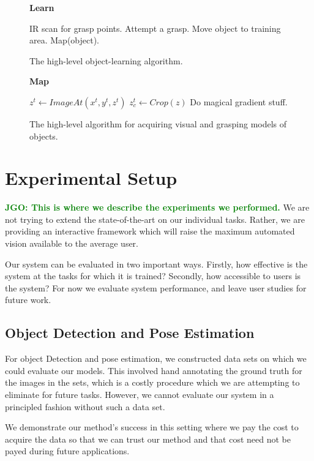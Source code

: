 \documentclass[conference]{IEEEtran}
\newcommand{\jgonote}[1]{\textcolor{green}{\textbf{JGO: #1}}}
\begin{document}
\begin{figure}
  \textbf{Learn}
  \begin{algorithmic}
      \STATE IR scan for grasp points.
      \STATE Attempt a grasp.
        \STATE Move object to training area.
        \STATE Map(object).
      \ENDIF
    \ENDWHILE
  \end{algorithmic}
  \caption{The high-level object-learning algorithm.\label{alg:learning}}
\end{figure}


\begin{figure}
  \textbf{Map}
  \begin{algorithmic}
    \STATE $z^t \gets ImageAt (x^t, y^t, z^t)$
    \STATE $z_c^t \gets Crop(z)$
    \STATE Do magical gradient stuff. 
    \ENDFOR
  \end{algorithmic}
  \caption{The high-level algorithm for acquiring visual and grasping
    models of objects.}
\end{figure}




\section{Experimental Setup}
\jgonote{This is where we describe the experiments we performed.}
We are not trying to extend the state-of-the-art on our individual tasks. Rather,
we are providing an interactive framework which will raise the maximum automated vision
available to the average user.

Our system can be evaluated in two important ways. Firstly, how effective is 
the system at the tasks for which it is trained? Secondly, how accessible to users is the system?
For now we evaluate system performance, and leave user studies for future work.

\subsection{Object Detection and Pose Estimation}
For object Detection and pose estimation, we constructed data
sets on which we could evaluate our models. This involved hand
annotating the ground truth for the images in the sets, which is a
costly procedure which we are attempting to eliminate for future tasks.
However, we cannot evaluate our system in a principled fashion without such
a data set.

We demonstrate our method's success in this setting where we pay the cost
to acquire the data so that we can trust our method and that cost need not be 
payed during future applications. 
\end{document}
